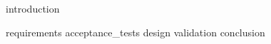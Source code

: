 \documentclass[10pt,a4paper]{report}
\newcommand{\texdir}{tex/} %
\begin{document}
\inserttitlepage

\inserttoc

{introduction}

{requirements}
{acceptance_tests}
{design}
{validation}
{conclusion}
\end{document}
